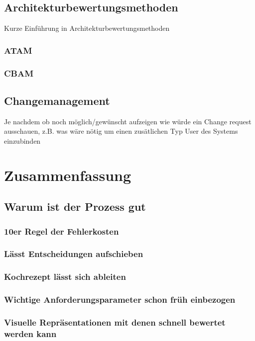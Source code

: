 \documentclass[Master,MSE,german]{twbook}
\begin{document}
\section{Architekturbewertungsmethoden}
Kurze Einführung in Architekturbewertungsmethoden

\subsection{ATAM}
\subsection{CBAM}





\section{Changemanagement}
Je nachdem ob noch möglich/gewünscht aufzeigen wie würde ein Change request ausschauen, z.B. was wäre nötig um einen zusätlichen Typ User des Systems einzubinden


\chapter{Zusammenfassung}

\section{Warum ist der Prozess gut}
\subsection{10er Regel der Fehlerkosten}
\subsection{Lässt Entscheidungen aufschieben}
\subsection{Kochrezept lässt sich ableiten}
\subsection{Wichtige Anforderungsparameter schon früh einbezogen}
\subsection{Visuelle Repräsentationen mit denen schnell bewertet werden kann}
\end{document}
